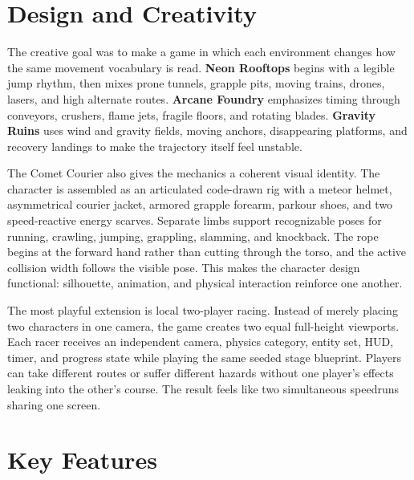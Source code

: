 \documentclass[11pt,letterpaper]{article}
\newcommand{\keyterm}[1]{\textbf{\color{navy}#1}}
\begin{document}
\section{Design and Creativity}

The creative goal was to make a game in which each environment changes how the same movement vocabulary is read. \keyterm{Neon Rooftops} begins with a legible jump rhythm, then mixes prone tunnels, grapple pits, moving trains, drones, lasers, and high alternate routes. \keyterm{Arcane Foundry} emphasizes timing through conveyors, crushers, flame jets, fragile floors, and rotating blades. \keyterm{Gravity Ruins} uses wind and gravity fields, moving anchors, disappearing platforms, and recovery landings to make the trajectory itself feel unstable.

The Comet Courier also gives the mechanics a coherent visual identity. The character is assembled as an articulated code-drawn rig with a meteor helmet, asymmetrical courier jacket, armored grapple forearm, parkour shoes, and two speed-reactive energy scarves. Separate limbs support recognizable poses for running, crawling, jumping, grappling, slamming, and knockback. The rope begins at the forward hand rather than cutting through the torso, and the active collision width follows the visible pose. This makes the character design functional: silhouette, animation, and physical interaction reinforce one another.

The most playful extension is local two-player racing. Instead of merely placing two characters in one camera, the game creates two equal full-height viewports. Each racer receives an independent camera, physics category, entity set, HUD, timer, and progress state while playing the same seeded stage blueprint. Players can take different routes or suffer different hazards without one player's effects leaking into the other's course. The result feels like two simultaneous speedruns sharing one screen.

\newpage

\section{Key Features}
\end{document}
